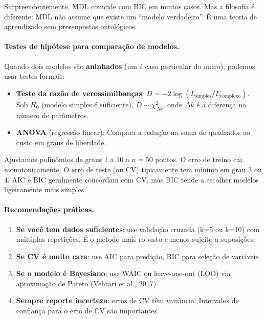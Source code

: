 \documentclass{tufte-handout}
\begin{document}
\begin{remark}
    Surpreendentemente, MDL coincide com BIC em muitos casos. Mas a filosofia é diferente: MDL não assume que existe um ``modelo verdadeiro''. É uma teoria de aprendizado sem pressupostos ontológicos.
\end{remark}

\paragraph{Testes de hipótese para comparação de modelos.}

Quando dois modelos são \textbf{aninhados} (um é caso particular do outro), podemos usar testes formais:

\begin{itemize}
    \item \textbf{Teste da razão de verossimilhanças}: $D = -2\log(L_{\text{simples}} / L_{\text{complexo}})$. Sob $H_0$ (modelo simples é suficiente), $D \sim \chi^2_{\Delta k}$, onde $\Delta k$ é a diferença no número de parâmetros.
    \item \textbf{ANOVA} (regressão linear): Compara a redução na soma de quadrados ao custo em graus de liberdade.
\end{itemize}

\begin{exmp}
    Ajustamos polinômios de graus 1 a 10 a $n = 50$ pontos. O erro de treino cai monotonicamente. O erro de teste (ou CV) tipicamente tem mínimo em grau 3 ou 4. AIC e BIC geralmente concordam com CV, mas BIC tende a escolher modelos ligeiramente mais simples.
\end{exmp}

\paragraph{Recomendações práticas.}

\begin{enumerate}
    \item \textbf{Se você tem dados suficientes}: use validação cruzada (k=5 ou k=10) com múltiplas repetições. É o método mais robusto e menos sujeito a suposições.
    \item \textbf{Se CV é muito cara}: use AIC para predição, BIC para seleção de variáveis.
    \item \textbf{Se o modelo é Bayesiano}: use WAIC ou leave-one-out (LOO) via aproximação de Pareto (Vehtari et al., 2017).
    \item \textbf{Sempre reporte incerteza}: erros de CV têm variância. Intervalos de confiança para o erro de CV são importantes.
\end{enumerate}
\end{document}
